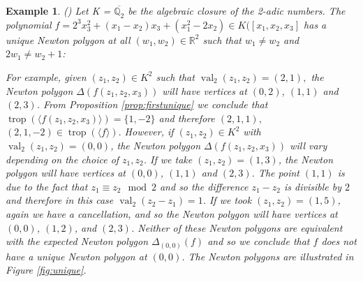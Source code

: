 \documentclass[11pt,reqno,a4paper]{article}
\theoremstyle{theoremstyle}
\theoremstyle{examplestyle}
\newtheorem{example}[theorem]{Example}
\theoremstyle{algorithmstyle}
\numberwithin{equation}{subsection}
\newcommand{\RR}{\mathbb{R}}
\newcommand{\QQ}{\mathbb{Q}}
\DeclareMathOperator{\trop}{trop}
\DeclareMathOperator{\val}{val}
\begin{document}
\begin{example} \label{ex:unique}
    (\cite[Ex. 2.9]{HR2018}) Let K = $\overline{\QQ_2}$ be the algebraic closure of the 2-adic numbers. The polynomial $f = 2^3x_3^2 + (x_1-x_2)x_3 + (x_1^2-2x_2) \in K([x_1,x_2,x_3]$ has a unique Newton polygon at all $(w_1,w_2) \in \RR^2$ such that $w_1 \neq w_2$ and $2w_1 \neq w_2+1$:
    
    For example, given $(z_1,z_2) \in K^2$ such that $\val_2(z_1,z_2) = (2,1), $ the Newton polygon $\Delta(f(z_1,z_2,x_3))$ will have vertices at $(0,2)$, $(1,1)$ and $(2,3)$. From Proposition \ref{prop:firstunique} we conclude that $\trop(\langle f(z_1,z_2,x_3) \rangle) = \{1, -2\}$ and therefore $(2,1,1),$ $(2,1,-2) \in \trop(\langle f\rangle).$ However, if $(z_1,z_2) \in K^2$ with \\$\val_2(z_1,z_2) = (0,0)$, the Newton polygon $\Delta(f(z_1,z_2,x_3))$ will vary depending on the choice of $z_1,z_2$. If we take $(z_1,z_2) = (1,3)$, the Newton polygon will have vertices at $(0,0)$, $(1,1)$ and $(2,3)$. The point $(1,1)$ is due to the fact that $z_1 \equiv z_2 \mod 2$ and so the difference $z_1-z_2$ is divisible by $2$ and therefore in this case $\val_2(z_2-z_1) = 1$. If we took $(z_1,z_2) = (1,5)$, again we have a cancellation, and so the Newton polygon will have vertices at $(0,0)$, $(1,2)$, and $(2,3)$. Neither of these Newton polygons are equivalent with the expected Newton polygon $\Delta_{(0,0)}(f)$ and so we conclude that $f$ does not have a unique Newton polygon at $(0,0)$. The Newton polygons are illustrated in Figure \ref{fig:unique}.
\end{example}
\end{document}
